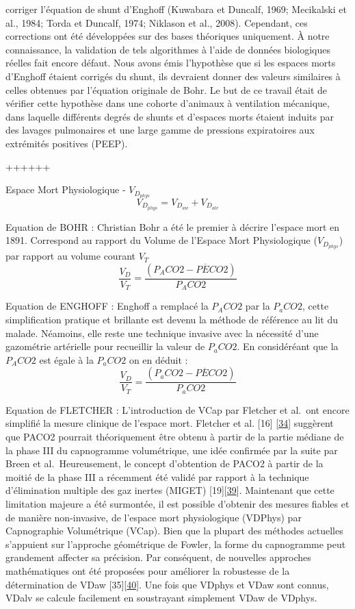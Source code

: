\documentclass[12pt,]{article}
\begin{document}
corriger l'équation de shunt d'Enghoff (Kuwabara et Duncalf, 1969;
Mecikalski et al., 1984; Torda et Duncalf, 1974; Niklason et al., 2008).
Cependant, ces corrections ont été développées sur des bases théoriques
uniquement. À notre connaissance, la validation de tels algorithmes à
l'aide de données biologiques réelles fait encore défaut. Nous avons
émis l'hypothèse que si les espaces morts d'Enghoff étaient corrigés du
shunt, ils devraient donner des valeurs similaires à celles obtenues par
l'équation originale de Bohr. Le but de ce travail était de vérifier
cette hypothèse dans une cohorte d'animaux à ventilation mécanique, dans
laquelle différents degrés de shunts et d'espaces morts étaient induits
par des lavages pulmonaires et une large gamme de pressions expiratoires
aux extrémités positives (PEEP).

++++++

Espace Mort Physiologique - \(V_{D_{phys}}\)
\[V_{D_{phys}}=V_{D_{aw}}+V_{D_{alv}}\]

Equation de BOHR : Christian Bohr a été le premier à décrire l'espace
mort en 1891. Correspond au rapport du Volume de l'Espace Mort
Physiologique (\(V_{D_{phys}}\)) par rapport au volume courant \(V_{T}\)
\[\frac{V_{D}}{V_{T}}=\frac{(P_{A}CO2-P\overline{E}CO2)}{P_{A}CO2}\]

Equation de ENGHOFF : Enghoff a remplacé la \(P_{A}CO2\) par la
\(P_{a}CO2\), cette simplification pratique et brillante est devenu la
méthode de référence au lit du malade. Néamoins, elle reste une
technique invasive avec la nécessité d'une gazométrie artérielle pour
recueillir la valeur de \(P_{a}CO2\). En considéréant que la
\(P_{A}CO2\) est égale à la \(P_{a}CO2\) on en déduit :
\[\frac{V_{D}}{V_{T}}=\frac{(P_{a}CO2-P\overline{E}CO2)}{P_{a}CO2}\]

Equation de FLETCHER : L'introduction de VCap par Fletcher et al.~ont
encore simplifié la mesure clinique de l'espace mort. Fletcher et al.
{[}16{]} {[}\protect\hyperlink{ref-fletcher1981concept}{34}{]} suggèrent
que PACO2 pourrait théoriquement être obtenu à partir de la partie
médiane de la phase III du capnogramme volumétrique, une idée confirmée
par la suite par Breen et al.~Heureusement, le concept d'obtention de
PACO2 à partir de la moitié de la phase III a récemment été validé par
rapport à la technique d'élimination multiple des gaz inertes (MIGET)
{[}19{]}{[}\protect\hyperlink{ref-tusman2011validation}{39}{]}.
Maintenant que cette limitation majeure a été surmontée, il est possible
d'obtenir des mesures fiables et de manière non-invasive, de l'espace
mort physiologique (VDPhys) par Capnographie Volumétrique (VCap). Bien
que la plupart des méthodes actuelles s'appuient sur l'approche
géométrique de Fowler, la forme du capnogramme peut grandement affecter
sa précision. Par conséquent, de nouvelles approches mathématiques ont
été proposées pour améliorer la robustesse de la détermination de VDaw
{[}35{]}{[}\protect\hyperlink{ref-tusman2009model}{40}{]}. Une fois que
VDphys et VDaw sont connus, VDalv se calcule facilement en soustrayant
simplement VDaw de VDphys.
\end{document}
